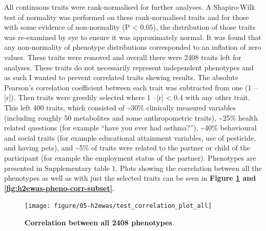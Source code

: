 \documentclass[11pt,oneside]{bristolthesis}
\begin{document}
All continuous traits were rank-normalised for further analyses. A Shapiro-Wilk test of normality was performed on these rank-normalised traits and for those with some evidence of non-normality (P \textless{} 0.05), the distribution of those traits was re-examined by eye to ensure it was approximately normal. It was found that any non-normality of phenotype distributions corresponded to an inflation of zero values. These traits were removed and overall there were 2408 traits left for analyses. These traits do not necessarily represent independent phenotypes and as such I wanted to prevent correlated traits skewing results. The absolute Pearson's correlation coefficient between each trait was subtracted from one (1 --{[}r{]}). Then traits were greedily selected where 1 --{[}r{]} \textless{} 0.4 with any other trait. This left 400 traits, which consisted of \textasciitilde30\% clinically measured variables (including roughly 50 metabolites and some anthropometric traits), \textasciitilde25\% health related questions (for example ``have you ever had asthma?''), \textasciitilde40\% behavioural and social traits (for example educational attainment variables, use of pesticide, and having pets), and \textasciitilde5\% of traits were related to the partner or child of the participant (for example the employment status of the partner). Phenotypes are presented in Supplementary table 1. Plots showing the correlation between all the phenotypes as well as with just the selected traits can be seen in \textbf{Figure \ref{fig:h2ewas-pheno-corr-all} and \ref{fig:h2ewas-pheno-corr-subset}}.




\begin{figure}

{\centering \texttt{[image: figure/05-h2ewas/test\_correlation\_plot\_all]} 

}

\caption[Correlation between all 2408 phenotypes]{\textbf{Correlation between all 2408 phenotypes}.}\label{fig:h2ewas-pheno-corr-all}
\end{figure}
\end{document}
